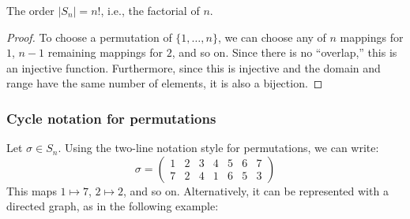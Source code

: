 \documentclass{article}
\theoremstyle{plain}
\begin{document}
\begin{theorem}{}{}
The order $|S_n| = n!$, i.e., the factorial of $n$.
\end{theorem}
\begin{proof}
To choose a permutation of $\{1,\ldots,n\}$, we can choose any of $n$ mappings for $1$, $n-1$ remaining mappings for $2$, and so on. Since there is no ``overlap,'' this is an injective function. Furthermore, since this is injective and the domain and range have the same number of elements, it is also a bijection.
\end{proof}
\newpage
\subsubsection{Cycle notation for permutations}
Let $\sigma \in S_n$. Using the two-line notation style for permutations, we can write:
$$\sigma = \begin{pmatrix}
1 & 2 & 3 & 4 & 5 & 6 & 7 \\
7 & 2 & 4 & 1 & 6 & 5 & 3
\end{pmatrix}$$
This maps $1\mapsto 7$, $2\mapsto 2$, and so on. Alternatively, it can be represented with a directed graph, as in the following example:
\end{document}
